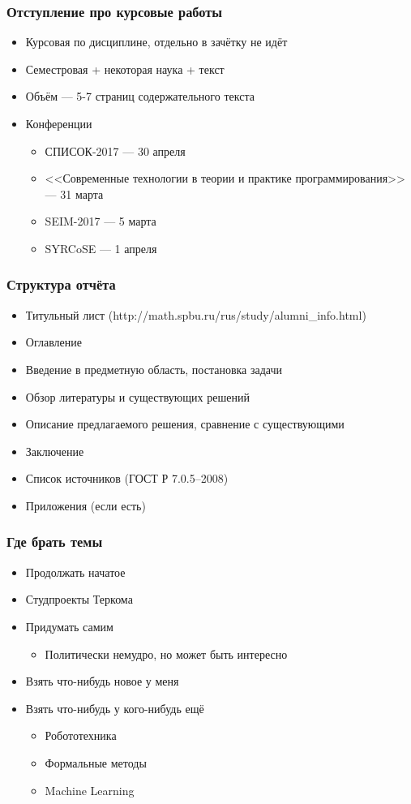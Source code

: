 \documentclass[xetex,mathserif,serif]{beamer}
\begin{document}
	\begin{frame}
		\frametitle{Отступление про курсовые работы}
		\begin{itemize}
			\item Курсовая по дисциплине, отдельно в зачётку не идёт
			\item Семестровая + некоторая наука + текст
			\item Объём --- 5-7 страниц содержательного текста
			\item Конференции
			\begin{itemize}
				\item СПИСОК-2017 --- 30 апреля
				\item {}<<Современные технологии в теории и практике программирования>> --- 31 марта
				\item SEIM-2017 --- 5 марта
				\item SYRCoSE --- 1 апреля
			\end{itemize}
		\end{itemize}					
	\end{frame}
	
	\begin{frame}
		\frametitle{Структура отчёта}
		\begin{itemize}
			\item Титульный лист (http://math.spbu.ru/rus/study/alumni\_info.html)
			\item Оглавление
			\item Введение в предметную область, постановка задачи
			\item Обзор литературы и существующих решений
			\item Описание предлагаемого решения, сравнение с существующими
			\item Заключение
			\item Список источников (ГОСТ Р 7.0.5--2008)
			\item Приложения (если есть)
		\end{itemize}					
	\end{frame}
	
	\begin{frame}
		\frametitle{Где брать темы}
		\begin{itemize}
			\item Продолжать начатое
			\item Студпроекты Теркома
			\item Придумать самим 
			\begin{itemize}
				\item Политически немудро, но может быть интересно
			\end{itemize}
			\item Взять что-нибудь новое у меня
			\item Взять что-нибудь у кого-нибудь ещё
			\begin{itemize}
				\item Робототехника
				\item Формальные методы
				\item Machine Learning
			\end{itemize}
		\end{itemize}					
	\end{frame}		
	
\end{document}
